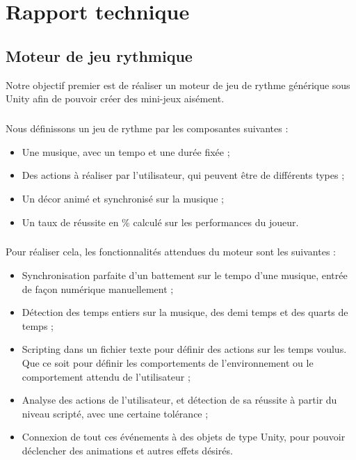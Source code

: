 \chapter{Rapport technique}


\section{Moteur de jeu rythmique}

Notre objectif premier est de réaliser un moteur de jeu de rythme générique sous Unity afin de pouvoir créer des mini-jeux aisément.

\paragraph{}

Nous définissons un jeu de rythme par les composantes suivantes :
\begin{itemize}
\item Une musique, avec un tempo et une durée fixée ;
\item Des actions à réaliser par l'utilisateur, qui peuvent être de différents types ;
\item Un décor animé et synchronisé sur la musique ;
\item Un taux de réussite en \% calculé sur les performances du joueur.
\end{itemize}

\paragraph{}

Pour réaliser cela, les fonctionnalités attendues du moteur sont les suivantes :
\begin{itemize}
\item Synchronisation parfaite d'un battement sur le tempo d'une musique, entrée de façon numérique manuellement ;
\item Détection des temps entiers sur la musique, des demi temps et des quarts de temps ;
\item Scripting dans un fichier texte pour définir des actions sur les temps voulus. Que ce soit pour définir les comportements de l'environnement ou le comportement attendu de l'utilisateur ;
\item Analyse des actions de l'utilisateur, et détection de sa réussite à partir du niveau scripté, avec une certaine tolérance ;
\item Connexion de tout ces événements à des objets de type Unity, pour pouvoir déclencher des animations et autres effets désirés.
\end{itemize}


